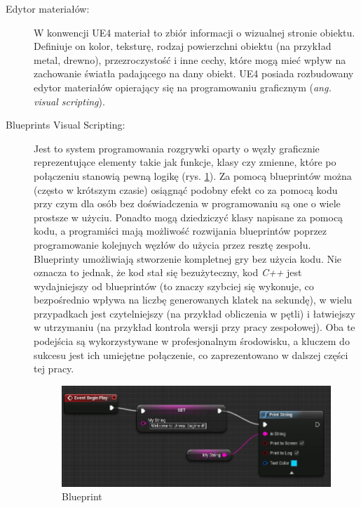 \documentclass[multip]{SGGW-thesis}
\begin{document}
\begin{description}
\item[Edytor materiałów:]W konwencji UE4 materiał to zbiór informacji o wizualnej stronie obiektu. Definiuje on kolor, teksturę, rodzaj powierzchni obiektu (na przykład metal, drewno), przezroczystość i inne cechy, które mogą mieć wpływ na zachowanie światła padającego na dany obiekt. UE4 posiada rozbudowany edytor materiałów opierający się na programowaniu graficznym ({\em ang. visual scripting}).
\item[Blueprints Visual Scripting:]Jest to system programowania rozgrywki oparty o węzły graficznie reprezentujące elementy takie jak funkcje, klasy czy zmienne, które po połączeniu stanowią pewną logikę (rys. \ref{fig-bp-example})\cite{docs-blueprints}. Za pomocą blueprintów można (często w krótszym czasie) osiągnąć podobny efekt co za pomocą kodu przy czym dla osób bez doświadczenia w programowaniu są one o wiele prostsze w użyciu. Ponadto mogą dziedziczyć klasy napisane za pomocą kodu, a programiści mają możliwość rozwijania blueprintów poprzez programowanie kolejnych węzłów do użycia przez resztę zespołu. Blueprinty umożliwiają stworzenie kompletnej gry bez użycia kodu. Nie oznacza to jednak, że kod stał się bezużyteczny, kod {\em C++} jest wydajniejszy od blueprintów (to znaczy szybciej się wykonuje, co bezpośrednio wpływa na liczbę generowanych klatek na sekundę), w wielu przypadkach jest czytelniejszy (na przykład obliczenia w pętli) i łatwiejszy w utrzymaniu (na przykład kontrola wersji przy pracy zespołowej).
\newline Oba te podejścia są wykorzystywane w profesjonalnym środowisku, a kluczem do sukcesu jest ich umiejętne połączenie, co zaprezentowano w dalszej części tej pracy.
\begin{figure}
	\centering
		\includegraphics[width=1\textwidth]{figures/bp_example.jpg}
	\caption{Blueprint}
	\label{fig-bp-example}
\end{figure}

\end{description}
\end{document}
